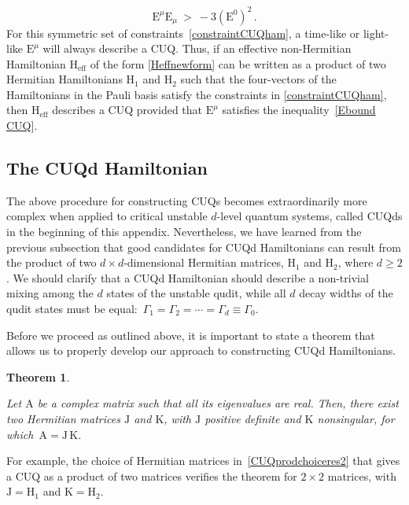 \documentclass[12pt,a4paper]{article}
\newtheorem{theorem}{Theorem}[section]
\begin{document}
\begin{equation}
    \mathrm{E}^\mu \mathrm{E}_\mu\: >\: -3(\mathrm{E}^0)^2\,.\label{Ebound CUQ}
\end{equation}
For this symmetric set of constraints~\eqref{constraintCUQham}, a time-like or light-like $\mathrm{E}^\mu$ will always describe a CUQ. Thus, if an effective non-Hermitian Hamiltonian $\mathrm{H}_{\text{eff}}$ of the form \eqref{Heffnewform} can be written as a product of two Hermitian Hamiltonians $\mathrm{H}_1$ and $\mathrm{H}_2$ such that the four-vectors of the Hamiltonians in the Pauli basis satisfy the constraints in \eqref{constraintCUQham}, then $\mathrm{H}_{\text{eff}}$ describes a CUQ provided that $\mathrm{E}^\mu$ satisfies the inequality~\eqref{Ebound CUQ}.


\subsection{The CUQd Hamiltonian}

The above procedure for constructing CUQs becomes extraordinarily more complex when applied to critical unstable $d$-level quantum systems, called CUQds in the beginning of this appendix.
Nevertheless, we have learned from the previous subsection that good candidates for CUQd Hamiltonians can result from the product of two $d\times d$-dimensional Hermitian matrices, $\mathrm{H}_1$ and $\mathrm{H}_2$, where $d\ge 2$. We should clarify that a CUQd Hamiltonian should describe a non-trivial mixing among the $d$ states of the unstable qudit, while all 
$d$ decay widths of the qudit states must be equal:~$\Gamma_1 = \Gamma_2 = \cdots = \Gamma_d \equiv \Gamma_0$.

Before we proceed as outlined above, it is important to state a theorem\cite{Carlson1965OnRE} that allows us to properly develop our approach to constructing CUQd Hamiltonians.
\begin{theorem}
    \begin{shaded}
    Let $\mathrm{A}$ be a complex matrix such that all its eigenvalues are real. Then, there exist two Hermitian matrices $\mathrm{J}$ and $\mathrm{K}$, with $\mathrm{J}$ positive definite and $\mathrm{K}$ nonsingular, for which~$\mathrm{A = J\,K}$.
\end{shaded}\label{theorem1}
\end{theorem}
For example, the choice of Hermitian matrices in~\eqref{CUQprodchoiceres2} that gives a CUQ as a product of two matrices verifies the theorem for $2\times2$ matrices, with $\mathrm{J} = \mathrm{H}_1$ and $\mathrm{K} = \mathrm{H}_2$.
\end{document}
